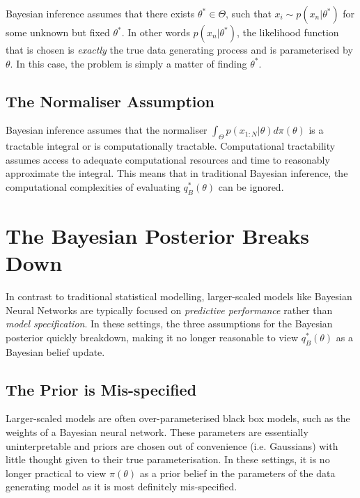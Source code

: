 \documentclass[twoside,11pt]{article}
\begin{document}
Bayesian inference assumes that there exists $\theta^* \in \Theta$, such that $x_i \sim p(x_n | \theta^*)$ for some unknown but fixed $\theta^*$. In other words $p(x_n | \theta^*)$, the likelihood function that is chosen is \textit{exactly} the true data generating process and is parameterised by $\theta$. In this case, the problem is simply a matter of finding $\theta^*$. 

\subsection{The Normaliser Assumption}\label{sec:normaliser}

Bayesian inference assumes that the normaliser $\int_{\Theta} p(x_{1:N}|\theta) d \pi(\theta)$ is a tractable integral or is computationally tractable. Computational tractability assumes access to  adequate computational resources and time to reasonably approximate the integral. This means that in traditional Bayesian inference, the computational complexities of evaluating $q_B^*(\theta)$ can be ignored. 

\section{The Bayesian Posterior Breaks Down \cite{knoblauch2022optimization}}
In contrast to traditional statistical modelling, larger-scaled models like Bayesian Neural Networks are typically focused on \textit{predictive performance} rather than \textit{model specification}. In these settings, the three  assumptions for the Bayesian posterior quickly breakdown, making it no longer reasonable to view $q_B^*(\theta)$ as a Bayesian belief update. 

\subsection{The Prior is Mis-specified}
Larger-scaled models are often over-parameterised black box models, such as the weights of a Bayesian neural network. These parameters are essentially uninterpretable and priors are chosen out of convenience (i.e. Gaussians) with little thought given to their true parameterisation. In these settings, it is no longer practical to view $\pi(\theta)$ as a prior belief in the parameters of the data generating model as it is most definitely mis-specified.
\end{document}
